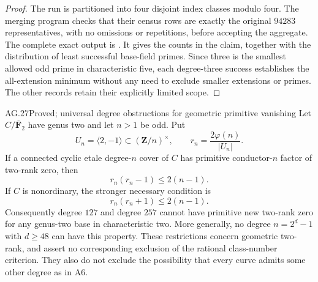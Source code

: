 \begin{proof}
The run is partitioned into four disjoint index classes
modulo four. The merging program
 checks that their census
rows are exactly the original $94283$ representatives,
with no omissions or repetitions, before accepting the
aggregate. The complete exact output is
. It gives the
counts in the claim, together with the distribution of
least successful base-field primes. Since three is the
smallest allowed odd prime in characteristic five, each
degree-three success establishes the all-extension minimum
without any need to exclude smaller extensions or primes.
The other records retain their explicitly limited scope.
\end{proof}


\begin{claim}{AG.27}{Proved; universal degree obstructions for geometric primitive vanishing}
Let $C/\overline{\mathbf F}_2$ have genus two and let
$n>1$ be odd. Put
\[
 U_n=\langle2,-1\rangle\subset(\mathbf Z/n)^\times,
 \qquad r_n=\frac{2\varphi(n)}{|U_n|}.
\]
If a connected cyclic etale degree-$n$ cover of $C$
has primitive conductor-$n$ factor of two-rank zero, then
\[
                   r_n(r_n-1)\le2(n-1).                 \tag{AG.27.1}
\]
If $C$ is nonordinary, the stronger necessary condition is
\[
                   r_n(r_n+1)\le2(n-1).                 \tag{AG.27.2}
\]
Consequently degree $127$ and degree $257$ cannot have
primitive new two-rank zero for any genus-two base in
characteristic two. More generally, no degree
$n=2^d-1$ with $d\ge48$ can have this property.
These restrictions concern geometric two-rank, and assert
no corresponding exclusion of the rational class-number
criterion. They also do not exclude the possibility that
every curve admits some other degree as in A6.
\end{claim}
